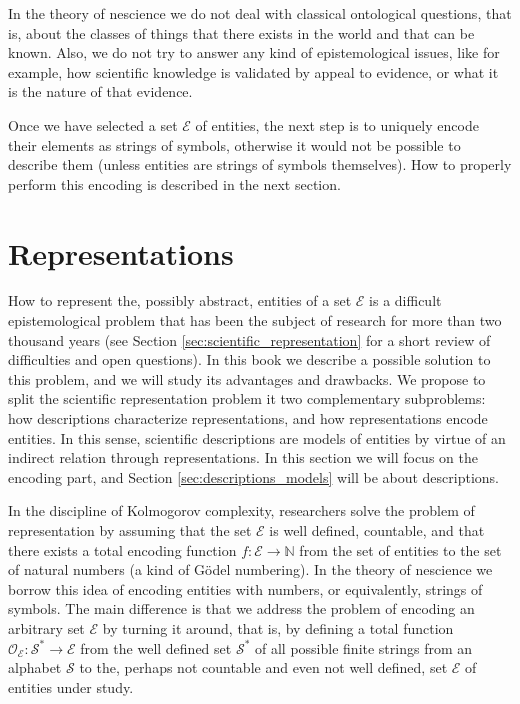 In the theory of nescience we do not deal with classical ontological questions, that is, about the classes of things that there exists in the world and that can be known. Also, we do not try to answer any kind of epistemological issues, like for example, how scientific knowledge is validated by appeal to evidence, or what it is the nature of that evidence.

Once we have selected a set $\mathcal{E}$ of entities, the next step is to uniquely encode their elements as strings of symbols, otherwise it would not be possible to describe them (unless entities are strings of symbols themselves). How to properly perform this encoding is described in the next section.

%
%

\section{Representations}
\label{sec:representations}

How to represent the, possibly abstract, entities of a set $\mathcal{E}$ is a difficult epistemological problem that has been the subject of research for more than two thousand years (see Section \ref{sec:scientific_representation} for a short review of difficulties and open questions). In this book we describe a possible solution to this problem, and we will study its advantages and drawbacks. We propose to split the scientific representation problem it two complementary subproblems: how descriptions characterize representations, and how representations encode entities. In this sense, scientific descriptions are models of entities by virtue of an indirect relation through representations. In this section we will focus on the encoding part, and Section \ref{sec:descriptions_models} will be about descriptions.

In the discipline of Kolmogorov complexity, researchers solve the problem of representation by assuming that the set $\mathcal{E}$ is well defined, countable, and that there exists a total encoding function $f:\mathcal{E} \rightarrow \mathbb{N}$ from the set of entities to the set of natural numbers (a kind of Gödel numbering). In the theory of nescience we borrow this idea of encoding entities with numbers, or equivalently, strings of symbols. The main difference is that we address the problem of encoding an arbitrary set $\mathcal{E}$ by turning it around, that is, by defining a total function $\mathcal{O}_\mathcal{E}:\mathcal{S}^\ast \rightarrow \mathcal{E}$ from the well defined set $\mathcal{S}^\ast$ of all possible finite strings from an alphabet $\mathcal{S}$ to the, perhaps not countable and even not well defined, set $\mathcal{E}$ of entities under study.

